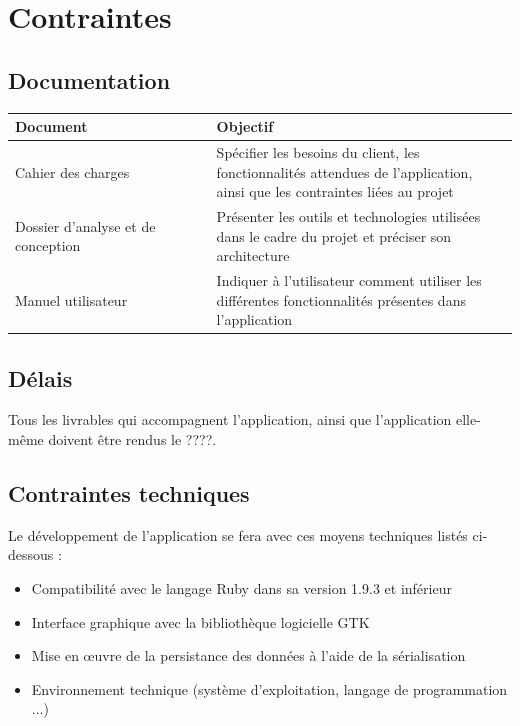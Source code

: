 \documentclass[a4paper, 12pt, twoside]{article}
\begin{document}
\section{Contraintes}

\subsection{Documentation}

\begin{tabular}{|>{\centering\arraybackslash}m{0.4\linewidth}|>{\centering\arraybackslash}m{0.6\linewidth}|}
  \hline
  \textbf{Document} & \textbf{Objectif}\\
  \hline
  Cahier des charges & Spécifier les besoins du client, les fonctionnalités attendues de l'application, ainsi que les contraintes liées au projet\\
  \hline
  Dossier d'analyse et de conception & Présenter les outils et technologies utilisées dans le cadre du projet et préciser son architecture\\
  \hline
  Manuel utilisateur & Indiquer à l'utilisateur comment utiliser les différentes fonctionnalités présentes dans l'application\\
  \hline
\end{tabular}


\subsection{Délais}%

Tous les livrables qui accompagnent l'application, ainsi que l'application elle-même doivent être rendus le ????.

\subsection{Contraintes techniques}

Le développement de l'application se fera avec ces moyens techniques listés ci-dessous :\newline

\begin{itemize}\setlength{\itemsep}{3mm}

 \item[\textbullet] Compatibilité avec le langage Ruby dans sa version 1.9.3 et inférieur
 \item[\textbullet] Interface graphique avec la bibliothèque logicielle GTK
 \item[\textbullet] Mise en \oe uvre de la persistance des données à l'aide de la sérialisation
 \item[\textbullet] Environnement technique (système d’exploitation, langage de programmation ...)
 
\end{itemize}
\end{document}
